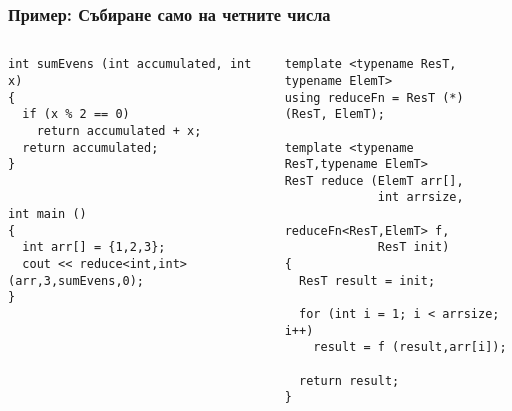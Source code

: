 \documentclass{beamer}
\begin{document}
\begin{frame}[fragile]
\frametitle{Пример: Събиране само на четните числа}


\begin{columns}[t]
  \begin{column}{0.55\textwidth}

\begin{flushleft}
\begin{lstlisting}
int sumEvens (int accumulated, int x)
{
  if (x % 2 == 0)
    return accumulated + x;
  return accumulated;
}


int main ()
{
  int arr[] = {1,2,3};
  cout << reduce<int,int> (arr,3,sumEvens,0);
}

\end{lstlisting}  
\end{flushleft}
  \end{column}
  \begin{column}{0.45\textwidth}
\begin{flushleft}
\vspace{-30px}
\begin{lstlisting}
template <typename ResT, typename ElemT>
using reduceFn = ResT (*) (ResT, ElemT);

template <typename ResT,typename ElemT>
ResT reduce (ElemT arr[], 
             int arrsize, 
             reduceFn<ResT,ElemT> f, 
             ResT init)
{
  ResT result = init;

  for (int i = 1; i < arrsize; i++)
    result = f (result,arr[i]);

  return result;
}
\end{lstlisting}  
\end{flushleft}

  \end{column}
\end{columns}

\end{frame}
\end{document}
